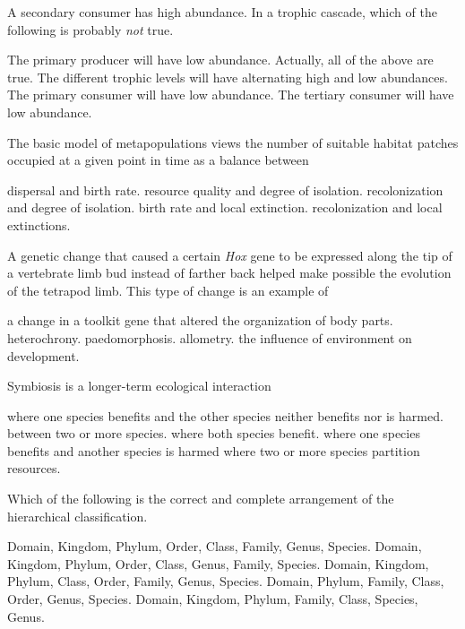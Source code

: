
\question
A secondary consumer has high abundance. In a trophic cascade, which of the following is probably \emph{not} true.
\begin{choices}
\correctchoice The primary producer will have low abundance. 
\choice Actually, all of the above are true. 
\choice The different trophic levels will have alternating high and low abundances. 
\choice The primary consumer will have low abundance. 
\choice The tertiary consumer will have low abundance. 
\end{choices}

\question
The basic model of metapopulations views the number of suitable habitat patches occupied at a given point in time as a balance between

\begin{choices}
\choice dispersal and birth rate. 
\choice resource quality and degree of isolation. 
\choice recolonization and degree of isolation. 
\choice birth rate and local extinction. 
\correctchoice recolonization and local extinctions. 
\end{choices}

\question
A genetic change that caused a certain \textit{Hox} gene to be expressed along the tip of a vertebrate limb bud instead of farther back helped make possible the  evolution of the tetrapod limb. This type of change is an example of 
\begin{choices}
\correctchoice a change in a toolkit gene that altered the organization of body parts.
\choice heterochrony.
\choice paedomorphosis.
\choice allometry.
\choice the influence of environment on development.
\end{choices}

\question
Symbiosis is a longer-term ecological interaction

\begin{choices}
\choice  where one species benefits and the other species neither benefits nor is harmed. 
\correctchoice between two or more species. 
\choice where both species benefit. 
\choice where one species benefits and another species is harmed 
\choice where two or more species partition resources. 
\end{choices}

\question
Which of the following is the correct and complete arrangement of the hierarchical classification. 
\begin{choices}
\choice  Domain, Kingdom, Phylum, Order, Class, Family, Genus, Species.
\choice  Domain, Kingdom, Phylum, Order, Class, Genus, Family, Species.
\correctchoice  Domain, Kingdom, Phylum, Class, Order, Family, Genus, Species.
\choice  Domain, Phylum, Family, Class, Order, Genus, Species.
\choice  Domain, Kingdom, Phylum, Family, Class, Species, Genus.
\end{choices}

